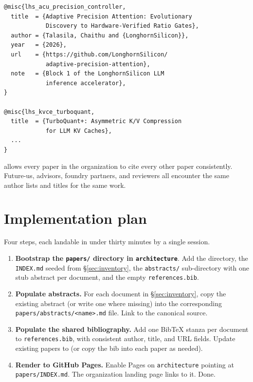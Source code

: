 \documentclass[11pt]{article}
\begin{document}
\begin{lstlisting}[basicstyle=\ttfamily\small,frame=single]
@misc{lhs_acu_precision_controller,
  title  = {Adaptive Precision Attention: Evolutionary
            Discovery to Hardware-Verified Ratio Gates},
  author = {Talasila, Chaithu and {LonghornSilicon}},
  year   = {2026},
  url    = {https://github.com/LonghornSilicon/
            adaptive-precision-attention},
  note   = {Block 1 of the LonghornSilicon LLM
            inference accelerator},
}

@misc{lhs_kvce_turboquant,
  title  = {TurboQuant+: Asymmetric K/V Compression
            for LLM KV Caches},
  ...
}
\end{lstlisting}

allows every paper in the organization to cite every other paper
consistently. Future-us, advisors, foundry partners, and reviewers
all encounter the same author lists and titles for the same work.

\section{Implementation plan}

Four steps, each landable in under thirty minutes by a single
session.

\begin{enumerate}
\item \textbf{Bootstrap the \texttt{papers/} directory in
\texttt{architecture}}. Add the directory, the \texttt{INDEX.md}
seeded from \S\ref{sec:inventory}, the \texttt{abstracts/}
sub-directory with one stub abstract per document, and the empty
\texttt{references.bib}.

\item \textbf{Populate abstracts.} For each document in
\S\ref{sec:inventory}, copy the existing abstract (or write one
where missing) into the corresponding
\texttt{papers/abstracts/<name>.md} file. Link to the canonical
source.

\item \textbf{Populate the shared bibliography.} Add one BibTeX
stanza per document to \texttt{references.bib}, with consistent
author, title, and URL fields. Update existing papers to
\verb|| (or copy
the bib into each paper as needed).

\item \textbf{Render to GitHub Pages.} Enable Pages on
\texttt{architecture} pointing at \texttt{papers/INDEX.md}. The
organization landing page links to it. Done.
\end{enumerate}
\end{document}
